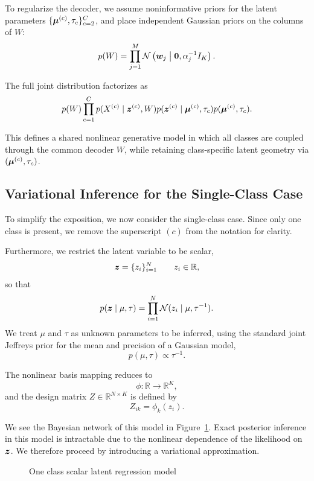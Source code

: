 To regularize the decoder,
we assume noninformative priors for the latent parameters
$\{\bm{\mu}^{(c)}, \tau_c\}_{c=2}^C$,
and place independent Gaussian priors on the columns of $W$:
\[
    p(W)
    =
    \prod_{j=1}^{M}
    \mathcal{N} \left( \bm{w}_j \;\middle|\; \bm{0}, \alpha_j^{-1} I_K \right).
\]

The full joint distribution factorizes as
\[
    p(W)
    \prod_{c=1}^C
    p(X^{(c)} \mid \bm{z}^{(c)}, W)
    p(\bm{z}^{(c)} \mid \bm{\mu}^{(c)}, \tau_c)
    p(\bm{\mu}^{(c)}, \tau_c).
\]

This defines a shared nonlinear generative model in which
all classes are coupled through the common decoder $W$,
while retaining class-specific latent geometry via
$(\bm{\mu}^{(c)}, \tau_c)$.

\subsection{Variational Inference for the Single-Class Case}

To simplify the exposition, we now consider the single-class case.
Since only one class is present, we remove the superscript $(c)$
from the notation for clarity.

Furthermore, we restrict the latent variable to be scalar,
\[
    \bm{z} = \{z_i\}_{i=1}^N
    \qquad
    z_i \in \mathbb{R},
\]
so that
\[
    p(\bm{z} \mid \mu, \tau)
    =
    \prod_{i=1}^N
    \mathcal{N}(z_i \mid \mu, \tau^{-1}).
\]
We treat $\mu$ and $\tau$ as unknown parameters to be inferred,
using the standard joint Jeffreys prior for the mean and precision of a Gaussian model,
\[p(\mu, \tau) \propto \tau^{-1}.\]

The nonlinear basis mapping reduces to
\[
    \phi : \mathbb{R} \to \mathbb{R}^K,
\]
and the design matrix $Z \in \mathbb{R}^{N \times K}$ is defined by
\[
    Z_{ik} = \phi_k(z_i).
\]

We see the Bayesian network of this model in Figure~\ref{fig:regression_bayes_net}.
Exact posterior inference in this model is intractable
due to the nonlinear dependence of the likelihood on $\bm{z}$.
We therefore proceed by introducing a variational approximation.

\begin{figure}[t]
    \centering
    \caption{One class scalar latent regression model}\label{fig:regression_bayes_net}
\end{figure}

